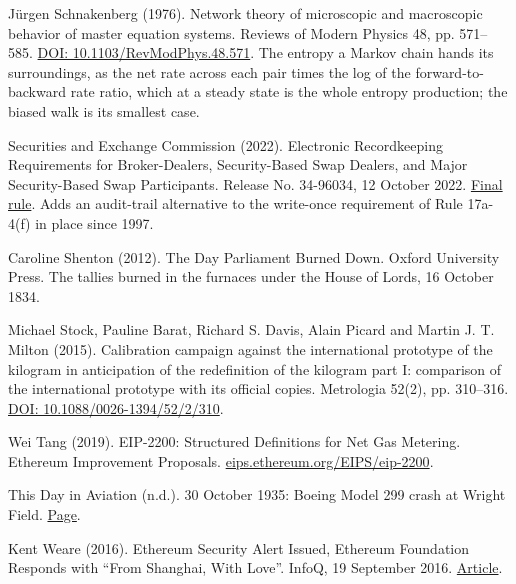 \documentclass[11pt,twoside]{article}
\theoremstyle{thielethm}
\theoremstyle{thieledef}
\theoremstyle{thieledef}
\theoremstyle{thieledef}
\theoremstyle{thielethm}
\theoremstyle{thieleobs}
\theoremstyle{thielethm}
\begin{document}
\noindent J\"urgen Schnakenberg (1976). Network theory of microscopic and macroscopic behavior of master equation systems. Reviews of Modern Physics 48, pp. 571--585. \href{https://doi.org/10.1103/RevModPhys.48.571}{DOI: 10.1103/RevModPhys.48.571}. The entropy a Markov chain hands its surroundings, as the net rate across each pair times the log of the forward-to-backward rate ratio, which at a steady state is the whole entropy production; the biased walk is its smallest case.
\par\medskip

\noindent Securities and Exchange Commission (2022). Electronic Recordkeeping Requirements for Broker-Dealers, Security-Based Swap Dealers, and Major Security-Based Swap Participants. Release No. 34-96034, 12 October 2022. \href{https://www.sec.gov/rules/final/2022/34-96034.pdf}{Final rule}. Adds an audit-trail alternative to the write-once requirement of Rule 17a-4(f) in place since 1997.
\par\medskip

\noindent Caroline Shenton (2012). The Day Parliament Burned Down. Oxford University Press. The tallies burned in the furnaces under the House of Lords, 16 October 1834.
\par\medskip

\noindent Michael Stock, Pauline Barat, Richard S. Davis, Alain Picard and Martin J. T. Milton (2015). Calibration campaign against the international prototype of the kilogram in anticipation of the redefinition of the kilogram part I: comparison of the international prototype with its official copies. Metrologia 52(2), pp. 310--316. \href{https://doi.org/10.1088/0026-1394/52/2/310}{DOI: 10.1088/0026-1394/52/2/310}.
\par\medskip

\noindent Wei Tang (2019). EIP-2200: Structured Definitions for Net Gas Metering. Ethereum Improvement Proposals. \href{https://eips.ethereum.org/EIPS/eip-2200}{eips.ethereum.org/EIPS/eip-2200}.
\par\medskip

\noindent This Day in Aviation (n.d.). 30 October 1935: Boeing Model 299 crash at Wright Field. \href{https://www.thisdayinaviation.com/30-october-1935/}{Page}.
\par\medskip

\noindent Kent Weare (2016). Ethereum Security Alert Issued, Ethereum Foundation Responds with ``From Shanghai, With Love''. InfoQ, 19 September 2016. \href{https://www.infoq.com/news/2016/09/Ethereum-DOS-Attack}{Article}.
\par\medskip
\end{document}
